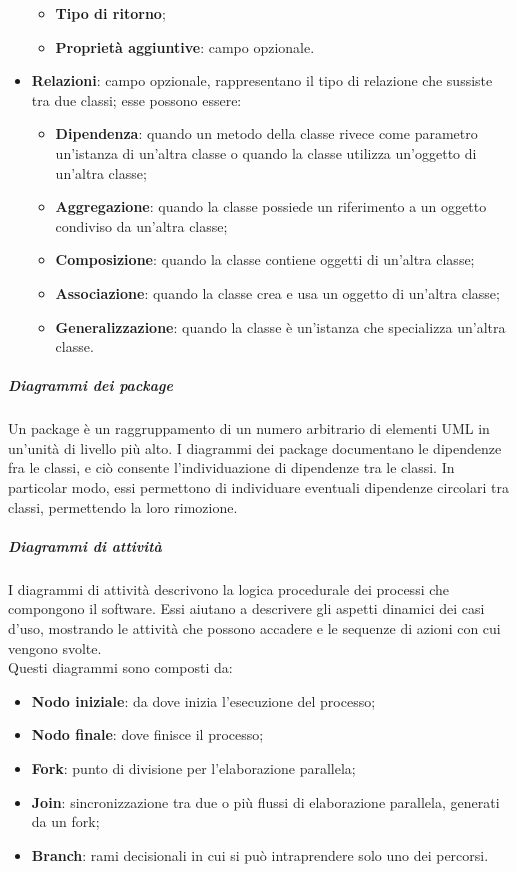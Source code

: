 \documentclass[../norme-di-progetto.tex]{subfiles}
\begin{document}
\begin{itemize}
\begin{itemize}
\begin{itemize}
      \end{itemize}
      \item \textbf{Tipo di ritorno};
      \item \textbf{Proprietà aggiuntive}: campo opzionale.
    \end{itemize}
  \item \textbf{Relazioni}: campo opzionale, rappresentano il tipo di relazione che sussiste tra due classi; esse possono essere:
  \begin{itemize}
    \item \textbf{Dipendenza}: quando un metodo della classe rivece come parametro un'istanza di un'altra classe o quando la classe utilizza un'oggetto di un'altra classe;
    \item \textbf{Aggregazione}: quando la classe possiede un riferimento a un oggetto condiviso da un'altra classe;
    \item \textbf{Composizione}: quando la classe contiene oggetti di un'altra classe;
    \item \textbf{Associazione}: quando la classe crea e usa un oggetto di un'altra classe;
    \item \textbf{Generalizzazione}: quando la classe è un'istanza che specializza un'altra classe.
  \end{itemize}
\end{itemize}

\subparagraph*{Diagrammi dei package}
Un package è un raggruppamento di un numero arbitrario di elementi UML in un'unità di livello più alto. I diagrammi dei package documentano le dipendenze fra le classi, e ciò consente l'individuazione di dipendenze tra le classi. In particolar modo, essi permettono di individuare eventuali dipendenze circolari tra classi, permettendo la loro rimozione.

\subparagraph*{Diagrammi di attività}
I diagrammi di attività descrivono la logica procedurale dei processi che compongono il software. Essi aiutano a descrivere gli aspetti dinamici dei casi d'uso, mostrando le attività che possono accadere e le sequenze di azioni con cui vengono svolte. \\
Questi diagrammi sono composti da:
\begin{itemize}
  \item \textbf{Nodo iniziale}: da dove inizia l'esecuzione del processo;
  \item \textbf{Nodo finale}: dove finisce il processo;
  \item \textbf{Fork}: punto di divisione per l'elaborazione parallela;
  \item \textbf{Join}: sincronizzazione tra due o più flussi di elaborazione parallela, generati da un fork;
  \item \textbf{Branch}: rami decisionali in cui si può intraprendere solo uno dei percorsi.
\end{itemize}
\end{document}
